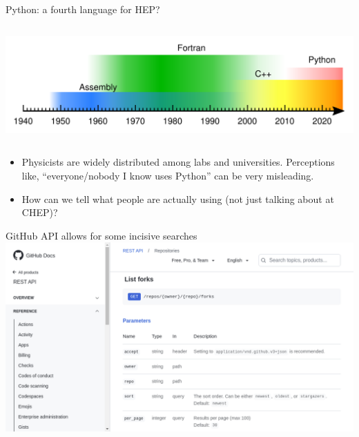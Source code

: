 \documentclass[aspectratio=169]{beamer}
\begin{document}
\begin{frame}
\begin{columns}
\end{columns}
\end{frame}

\begin{frame}{Python: a fourth language for HEP?}
\begin{columns}
\includegraphics[width=\linewidth]{PLOTS/programming-languages.pdf}
\end{columns}

\vspace{0.5 cm}
\begin{itemize}\setlength{\itemsep}{0.25 cm}
\item<2-> Physicists are widely distributed among labs and universities. Perceptions like, ``everyone/nobody I know uses Python'' can be very misleading.

\item<3-> How can we tell what people are actually using (not just talking about at CHEP)?
\end{itemize}
\end{frame}

\begin{frame}{GitHub API allows for some incisive searches}
\vspace{0.25 cm}
\includegraphics[width=\linewidth]{PLOTS/github-api-website.png}
\end{frame}
\end{document}

